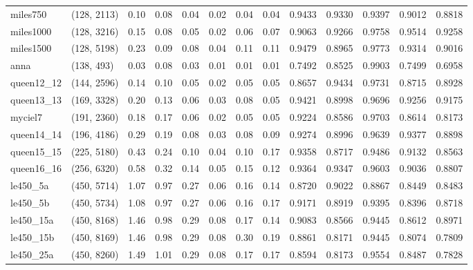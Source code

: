 \begin{tabular}{llrrrrrrrrrrr}
  miles750 &  (128, 2113) &  0.10 & 0.08 & 0.04 & 0.02 &  0.04 &   0.04 &   0.9433 &   0.9330 &    0.9397 &     0.9012 &      0.8818 \\
 miles1000 &  (128, 3216) &  0.15 & 0.08 & 0.05 & 0.02 &  0.06 &   0.07 &   0.9063 &   0.9266 &    0.9758 &     0.9514 &      0.9258 \\
 miles1500 &  (128, 5198) &  0.23 & 0.09 & 0.08 & 0.04 &  0.11 &   0.11 &   0.9479 &   0.8965 &    0.9773 &     0.9314 &      0.9016 \\
      anna &   (138, 493) &  0.03 & 0.08 & 0.03 & 0.01 &  0.01 &   0.01 &   0.7492 &   0.8525 &    0.9903 &     0.7499 &      0.6958 \\
queen12\_12 &  (144, 2596) &  0.14 & 0.10 & 0.05 & 0.02 &  0.05 &   0.05 &   0.8657 &   0.9434 &    0.9731 &     0.8715 &      0.8928 \\
queen13\_13 &  (169, 3328) &  0.20 & 0.13 & 0.06 & 0.03 &  0.08 &   0.05 &   0.9421 &   0.8998 &    0.9696 &     0.9256 &      0.9175 \\
   myciel7 &  (191, 2360) &  0.18 & 0.17 & 0.06 & 0.02 &  0.05 &   0.05 &   0.9224 &   0.8586 &    0.9703 &     0.8614 &      0.8173 \\
queen14\_14 &  (196, 4186) &  0.29 & 0.19 & 0.08 & 0.03 &  0.08 &   0.09 &   0.9274 &   0.8996 &    0.9639 &     0.9377 &      0.8898 \\
queen15\_15 &  (225, 5180) &  0.43 & 0.24 & 0.10 & 0.04 &  0.10 &   0.17 &   0.9358 &   0.8717 &    0.9486 &     0.9132 &      0.8563 \\
queen16\_16 &  (256, 6320) &  0.58 & 0.32 & 0.14 & 0.05 &  0.15 &   0.12 &   0.9364 &   0.9347 &    0.9603 &     0.9036 &      0.8807 \\
  le450\_5a &  (450, 5714) &  1.07 & 0.97 & 0.27 & 0.06 &  0.16 &   0.14 &   0.8720 &   0.9022 &    0.8867 &     0.8449 &      0.8483 \\
  le450\_5b &  (450, 5734) &  1.08 & 0.97 & 0.27 & 0.06 &  0.16 &   0.17 &   0.9171 &   0.8919 &    0.9395 &     0.8396 &      0.8718 \\
 le450\_15a &  (450, 8168) &  1.46 & 0.98 & 0.29 & 0.08 &  0.17 &   0.14 &   0.9083 &   0.8566 &    0.9445 &     0.8612 &      0.8971 \\
 le450\_15b &  (450, 8169) &  1.46 & 0.98 & 0.29 & 0.08 &  0.30 &   0.19 &   0.8861 &   0.8171 &    0.9445 &     0.8074 &      0.7809 \\
 le450\_25a &  (450, 8260) &  1.49 & 1.01 & 0.29 & 0.08 &  0.17 &   0.17 &   0.8594 &   0.8173 &    0.9554 &     0.8487 &      0.7828 \\

\end{tabular}
